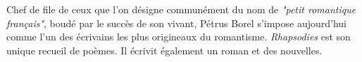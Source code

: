 \documentclass[12pt,a4paper]{article}
\begin{document}
\begin{center}
        \shadowbox{\begin{large}
                \textcolor{black}{Pétrus Borel}
        \end{large}}
    \end{center}
    \vspace{0.5 cm}
Chef de file de ceux que l'on d\'esigne commun\'ement du nom de \textit{"petit romantique fran\c cais"}, boud\'e par le succ\`es de son vivant,
        P\'etrus Borel s'impose aujourd'hui comme l'un des \'ecrivains les plus origineaux du romantisme. \textit{Rhapsodies} est son unique recueil de po\`emes. Il \'ecrivit \'egalement un roman et des nouvelles.
\end{document}
